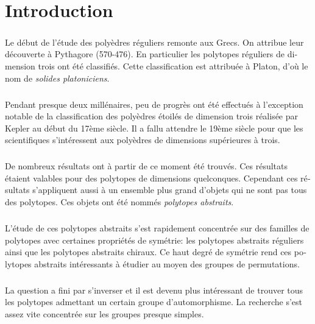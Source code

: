 \chapter*{Introduction}

\begin{otherlanguage}{french}

\paragraph{}
Le début de l'étude des polyèdres réguliers remonte aux Grecs. On attribue leur découverte à Pythagore (570-476). En particulier les  polytopes réguliers de dimension trois ont été classifiés. Cette classification est attribuée à Platon, d'où le nom de \textit{solides platoniciens}.

\paragraph{}
Pendant presque deux millénaires, peu de progrès ont été effectués à l'exception notable de la classification des polyèdres étoilés de dimension trois réalisée par Kepler au début du 17ème siècle. Il a fallu attendre le 19ème siècle pour que les scientifiques s'intéressent aux polyèdres de dimensions supérieures à trois.

\paragraph{}
De nombreux résultats ont à partir de ce moment été trouvés. Ces résultats étaient valables pour des polytopes de dimensions quelconques. Cependant ces résultats s'appliquent aussi à un ensemble plus grand d'objets qui ne sont pas tous des polytopes. Ces objets ont été nommés \textit{polytopes abstraits}.

\paragraph{}
L'étude de ces polytopes abstraits s'est rapidement concentrée sur des familles de polytopes avec certaines propriétés de symétrie: les polytopes abstraits réguliers ainsi que les polytopes abstraits chiraux. Ce haut degré de symétrie rend ces polytopes abstraits intéressants à étudier au moyen des groupes de permutations.

\paragraph{}
La question a fini par s'inverser et il est devenu plus intéressant de trouver tous les polytopes admettant un certain groupe d'automorphisme. La recherche s'est assez vite concentrée sur les groupes presque simples.


\end{otherlanguage}
